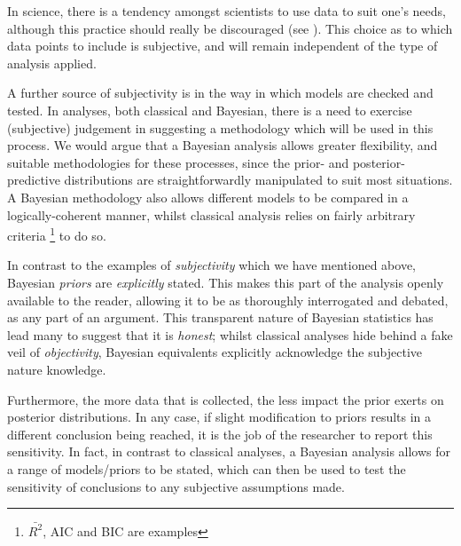 \documentclass[11pt,fullpage]{book}
\begin{document}
In science, there is a tendency amongst scientists to use data to suit one's needs, although this practice should really be discouraged (see \cite{ioannidis2005most}). This choice as to which data points to include is subjective, and will remain independent of the type of analysis applied. 

A further source of subjectivity is in the way in which models are checked and tested. In analyses, both classical and Bayesian, there is a need to exercise (subjective) judgement in suggesting a methodology which will be used in this process. We would argue that a Bayesian analysis allows greater flexibility, and suitable methodologies for these processes, since the prior- and posterior- predictive distributions are straightforwardly manipulated to suit most situations. A Bayesian methodology also allows different models to be compared in a logically-coherent manner, whilst classical analysis relies on fairly arbitrary criteria \footnote{$\bar{R^2}$, AIC and BIC are examples} to do so.

In contrast to the examples of \textit{subjectivity} which we have mentioned above, Bayesian \textit{priors} are \textit{explicitly} stated. This makes this part of the analysis openly available to the reader, allowing it to be as thoroughly interrogated and debated, as any part of an argument. This transparent nature of Bayesian statistics has lead many to suggest that it is \textit{honest}; whilst classical analyses hide behind a fake veil of \textit{objectivity}, Bayesian equivalents explicitly acknowledge the subjective nature knowledge.

Furthermore, the more data that is collected, the less impact the prior exerts on posterior distributions. In any case, if slight modification to priors results in a different conclusion being reached, it is the job of the researcher to report this sensitivity. In fact, in contrast to classical analyses, a Bayesian analysis allows for a range of models/priors to be stated, which can then be used to test the sensitivity of conclusions to any subjective assumptions made.
\end{document}
